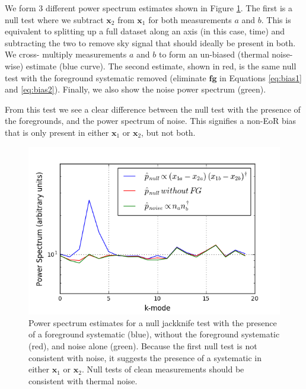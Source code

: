 \documentclass[preprint2,numberedappendix,tighten]{aastex6}  %
\begin{document}
We form $3$ different power spectrum estimates shown in Figure \ref{fig:toy_bias1}. The first is a null test where we subtract $
\textbf{x}_{2}$ from $\textbf{x}_{1}$ for both measurements $a$ and $b$. This is equivalent to splitting up a full dataset along 
an axis (in this case, time) and subtracting the two to remove sky signal that should ideally be present in both. We cross-
multiply measurements $a$ and $b$ to form an un-biased (thermal noise-wise) estimate (blue curve). The second estimate, 
shown in red, is the same null test with the foreground systematic removed (eliminate $\textbf{fg}$ in Equations \ref{eq:bias1} 
and \ref{eq:bias2}). Finally, we also show the noise power spectrum (green).

From this test we see a clear difference between the null test with the presence of the foregrounds, and the power spectrum of 
noise. This signifies a non-EoR bias that is only present in either $\textbf{x}_{1}$ or $\textbf{x}_{2}$, but not both.

\begin{figure}
	\centering
	\includegraphics[trim={0.3cm 0.3cm 0.3cm 0.3cm},width=\columnwidth]{plots/toy_bias1.png}
	\caption{Power spectrum estimates for a null jackknife test with the presence of a foreground systematic (blue), without 
the foreground systematic (red), and noise alone (green). Because the first null test is not consistent with noise, it suggests the 
presence of a systematic in either $\textbf{x}_{1}$ or $\textbf{x}_{2}$. Null tests of clean measurements should be consistent 
with thermal noise.}
	\label{fig:toy_bias1}
\end{figure}
\end{document}
